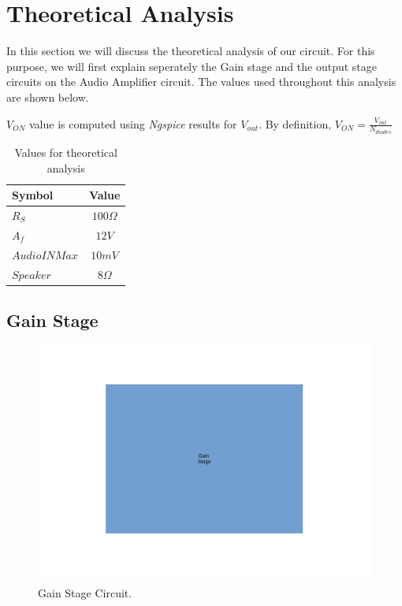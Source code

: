 \newpage
\section{Theoretical Analysis}
\label{sec:analysis}

In this section we will discuss the theoretical analysis of our circuit. For this purpose, we will first explain seperately the Gain stage and the output stage circuits on the Audio Amplifier circuit. The values used throughout this analysis are shown below. 

$V_{ON}$ value is computed using \textit{Ngspice} results for $V_{out}$. By definition, $V_{ON}=\frac{V_{out}}{N_{diodes}}$
\begin{table}[h]
    \centering
    \begin{tabular}{|l|c|}
    \hline
    {\bf Symbol} & {\bf Value} \\ \hline
    $R_{S}$ & $100\Omega$ \\ \hline
    $A_f$ & $12 V$ \\ \hline
    $Audio IN Max$ & $10 mV$  \\ \hline
    $Speaker$ & $8 \Omega$\\ \hline
    \end{tabular}
    \caption{Values for theoretical analysis}
    \label{tab:values}
\end{table}


\subsection{Gain Stage}
\label{sec:gain}

\begin{figure}[!ht] \centering
\includegraphics[width=0.8\linewidth]{gain.pdf} 
\squeezeup 
\caption{Gain Stage Circuit.}
\label{fig:gain}
\end{figure}

